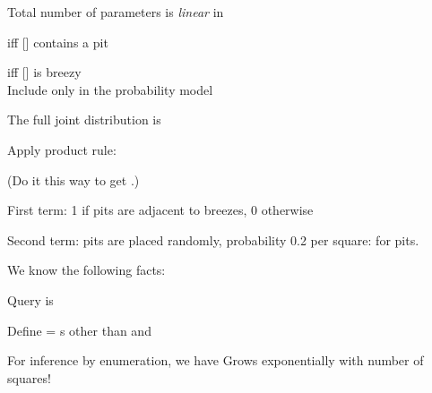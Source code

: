 \documentclass{article}
\begin{document}
\begin{huge}
\vspace*{0.3in}

\textwidth
{}

Total number of parameters is \emph{linear} in 


\textwidth
{}

 iff [] contains a pit

 iff [] is breezy\\
Include only  in the probability model


The full joint distribution is 

Apply product rule: 

(Do it this way to get .)

First term: 1 if pits are adjacent to breezes, 0 otherwise

Second term: pits are placed randomly, probability 0.2 per square:
\mat{\[
   \pv(P_{1,1},\ldots,P_{4,4}) = \myprod_{i,j\eq 1,1}^{4,4} \pv(P_{i,j}) = 0.2^n \stimes 0.8^{16-n}
\]}
for  pits.


We know the following facts:\al
{}\al
{}

Query is 

Define  = s other than  and 

For inference by enumeration, we have
\mat{\[
  \pv(P_{1,3}|known,b) = \alpha \mysum_{unknown}\pv(P_{1,3},unknown,known,b)  
\]}
Grows exponentially with number of squares!



\end{huge}
\end{document}
